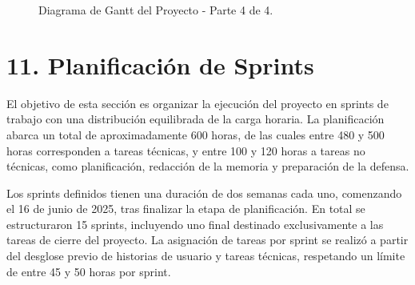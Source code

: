 \documentclass[
11pt, %
]{charter}
\begin{document}
\vspace{15px}

\begin{figure}[htpb]
\centering
{}
\caption{Diagrama de Gantt del Proyecto - Parte 4 de 4.}
\label{fig:diagBloques}
\end{figure}

\vspace{25px}

\section{11. Planificación de Sprints}

El objetivo de esta sección es organizar la ejecución del proyecto en sprints de trabajo con una distribución equilibrada de la carga horaria. La planificación abarca un total de aproximadamente 600 horas, de las cuales entre 480 y 500 horas corresponden a tareas técnicas, y entre 100 y 120 horas a tareas no técnicas, como planificación, redacción de la memoria y preparación de la defensa.

Los sprints definidos tienen una duración de dos semanas cada uno, comenzando el 16 de junio de 2025, tras finalizar la etapa de planificación. En total se estructuraron 15 sprints, incluyendo uno final destinado exclusivamente a las tareas de cierre del proyecto. La asignación de tareas por sprint se realizó a partir del desglose previo de historias de usuario y tareas técnicas, respetando un límite de entre 45 y 50 horas por sprint.
\end{document}
